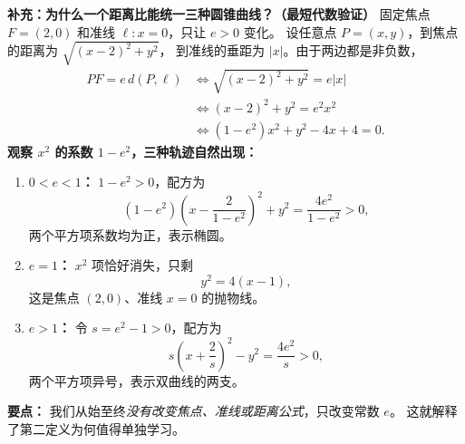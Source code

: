 \begin{proofbox}
\textbf{补充：为什么一个距离比能统一三种圆锥曲线？（最短代数验证）}
固定焦点 $F=(2,0)$ 和准线 $\ell:x=0$，只让 $e>0$ 变化。
设任意点 $P=(x,y)$，到焦点的距离为 $\sqrt{(x-2)^2+y^2}$，
到准线的垂距为 $|x|$。由于两边都是非负数，
\[
\begin{aligned}
PF=e\,d(P,\ell)
&\Longleftrightarrow \sqrt{(x-2)^2+y^2}=e|x|\\
&\Longleftrightarrow (x-2)^2+y^2=e^2x^2\\
&\Longleftrightarrow
\boxed{(1-e^2)x^2+y^2-4x+4=0}.
\end{aligned}
\]
\textbf{观察 $x^2$ 的系数 $1-e^2$，三种轨迹自然出现：}
\begin{enumerate}[leftmargin=*]
\item \textbf{$0<e<1$：} $1-e^2>0$，配方为
\[
(1-e^2)\left(x-\frac{2}{1-e^2}\right)^2+y^2
=\frac{4e^2}{1-e^2}>0,
\]
两个平方项系数均为正，表示椭圆。
\item \textbf{$e=1$：} $x^2$ 项恰好消失，只剩
\[\boxed{y^2=4(x-1)},\]
这是焦点 $(2,0)$、准线 $x=0$ 的抛物线。
\item \textbf{$e>1$：} 令 $s=e^2-1>0$，配方为
\[
s\left(x+\frac2s\right)^2-y^2
=\frac{4e^2}{s}>0,
\]
两个平方项异号，表示双曲线的两支。
\end{enumerate}
\textbf{要点：} 我们从始至终\emph{没有改变焦点、准线或距离公式}，只改变常数 $e$。
这就解释了第二定义为何值得单独学习。
\end{proofbox}


